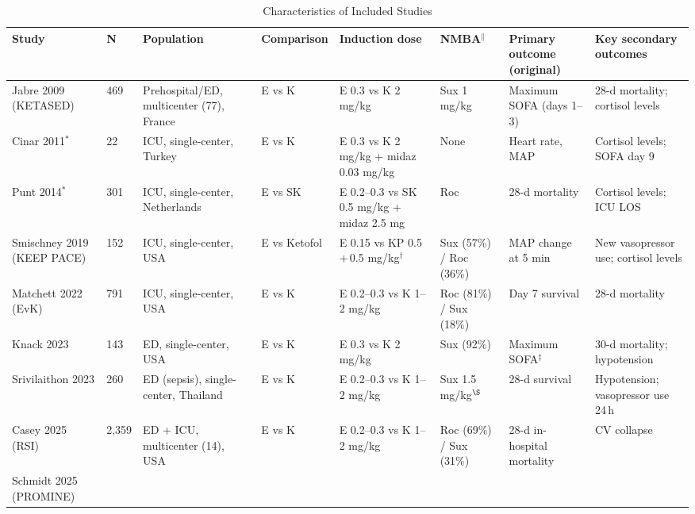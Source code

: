 \documentclass[11pt]{article}
\begin{document}
\clearpage


\begin{landscape}
\begin{table}[p]
\centering
\caption{Characteristics of Included Studies}
\label{tab:characteristics}
\footnotesize
\begin{tabularx}{\linewidth}{L{2.2cm} R{0.5cm} L{2.5cm} L{2cm} L{2.3cm} L{2cm} L{2.5cm} L{2.5cm}}
\toprule
Study & N & Population & Comparison & Induction dose & NMBA$^{\|}$ & Primary outcome (original) & Key secondary outcomes \\
\midrule
Jabre 2009 (KETASED)
  & 469 & Prehospital/ED, multicenter (77), France
  & E vs K & E 0.3 vs K 2 mg/kg & Sux 1 mg/kg
  & Maximum SOFA (days 1--3) & 28-d mortality; cortisol levels \\[4pt]
Cinar 2011$^{*}$
  & 22 & ICU, single-center, Turkey
  & E vs K & E 0.3 vs K 2 mg/kg + midaz 0.03 mg/kg & None
  & Heart rate, MAP & Cortisol levels; SOFA day 9 \\[4pt]
Punt 2014$^{*}$
  & 301 & ICU, single-center, Netherlands
  & E vs SK & E 0.2--0.3 vs SK 0.5 mg/kg + midaz 2.5 mg & Roc
  & 28-d mortality & Cortisol levels; ICU LOS \\[4pt]
Smischney 2019 (KEEP PACE)
  & 152 & ICU, single-center, USA
  & E vs Ketofol & E 0.15 vs KP 0.5\,+\,0.5 mg/kg$^{\dagger}$ & Sux (57\%) / Roc (36\%)
  & MAP change at 5 min & New vasopressor use; cortisol levels \\[4pt]
Matchett 2022 (EvK)
  & 791 & ICU, single-center, USA
  & E vs K & E 0.2--0.3 vs K 1--2 mg/kg & Roc (81\%) / Sux (18\%)
  & Day 7 survival & 28-d mortality \\[4pt]
Knack 2023
  & 143 & ED, single-center, USA
  & E vs K & E 0.3 vs K 2 mg/kg & Sux (92\%)
  & Maximum SOFA$^{\ddagger}$ & 30-d mortality; hypotension \\[4pt]
Srivilaithon 2023
  & 260 & ED (sepsis), single-center, Thailand
  & E vs K & E 0.2--0.3 vs K 1--2 mg/kg & Sux 1.5 mg/kg$^{\S}$
  & 28-d survival & Hypotension; vasopressor use 24\,h \\[4pt]
Casey 2025 (RSI)
  & 2,359 & ED + ICU, multicenter (14), USA
  & E vs K & E 0.2--0.3 vs K 1--2 mg/kg & Roc (69\%) / Sux (31\%)
  & 28-d in-hospital mortality & CV collapse \\[4pt]
Schmidt 2025 (PROMINE)

\end{tabularx}
\end{table}
\end{landscape}
\end{document}
